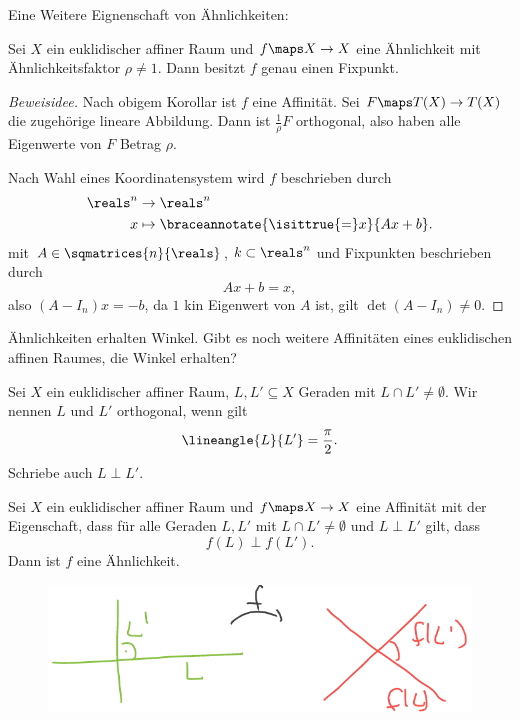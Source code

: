 Eine Weitere Eignenschaft von Ähnlichkeiten:
\begin{satz}
  Sei \( X \) ein euklidischer affiner Raum und \( f\maps X\to X \) eine Ähnlichkeit mit Ähnlichkeitsfaktor \( \rho\neq 1 \). Dann besitzt \( f \) genau einen Fixpunkt.
\end{satz}
\begin{proof}[Beweisidee]
  Nach obigem Korollar ist \( f \) eine Affinität. Sei \( F\maps T(X)\to T(X) \) die zugehörige lineare Abbildung. Dann ist \( \frac{1}{\rho} F \) orthogonal, also haben alle Eigenwerte von \( F \) Betrag \( \rho \). 

  Nach Wahl eines Koordinatensystem wird \( f \) beschrieben durch
  \begin{align*}
    \reals^n&\to \reals^n\\
    x&\mapsto \braceannotate{\isittrue{=}x}{Ax+b}.
  \end{align*}
  mit \( A\in \sqmatrices{n}{\reals} \), \( k\subset \reals^n \) und Fixpunkten beschrieben durch
  \begin{equation*}
    Ax+b=x,
  \end{equation*}
  also \( (A-I_n)x=-b \), da \( 1 \) kin Eigenwert von \( A \) ist, gilt \( \det(A-I_n)\neq 0 \).
\end{proof}
Ähnlichkeiten erhalten Winkel. Gibt es noch weitere Affinitäten eines euklidischen affinen Raumes, die Winkel erhalten?
\begin{definition*}
  Sei \( X \) ein euklidischer affiner Raum, \( L,L'\subseteq X \) Geraden mit \( L\cap L'\neq \emptyset \). Wir nennen \( L \) und \( L' \) orthogonal, wenn gilt
  \begin{equation*}
    \lineangle{L}{L'}=\frac{\pi}{2}.
  \end{equation*}
  Schriebe auch \( L\perp L' \).
\end{definition*}
\begin{satz}\label{nur_aehnlichkeiten_erhalten_rechte_winkel}
  Sei \( X \) ein euklidischer affiner Raum und \( f\maps X\to X \) eine Affinität mit der Eigenschaft, dass für alle Geraden \( L,L' \) mit \( L\cap L'\neq \emptyset \) und \( L\perp L' \) gilt, dass
  \begin{equation*}
    f(L)\perp f(L').
  \end{equation*}
  Dann ist \( f \) eine Ähnlichkeit.
  \begin{figure}[H]
    \centering
    \includegraphics[width=0.5\linewidth]{figures/rechte_winkel_erhalten}
    \label{fig:rechte_winkel_erhalten}
  \end{figure}
\end{satz}
